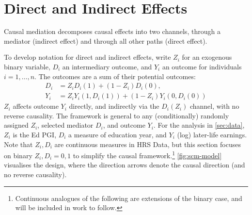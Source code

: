 \section{Direct and Indirect Effects}
\label{sec:concepts}
Causal mediation decomposes causal effects into two channels, through a mediator (indirect effect) and through all other paths (direct effect).


To develop notation for direct and indirect effects, write $Z_i$ for an exogenous binary variable, $D_i$ an intermediary outcome, and $Y_i$ an outcome for individuals $i = 1, \hdots, n$.
The outcomes are a sum of their potential outcomes:
\begin{align*}
    D_i &= Z_i       D_i(1)
        + (1 - Z_i) D_i(0),  \\
    Y_i &= Z_i       Y_i(1, D_i(1))
        + (1 - Z_i) Y_i(0, D_i(0))
\end{align*}
$Z_i$ affects outcome $Y_i$ directly, and indirectly via the $D_i(Z_i)$ channel, with no reverse causality.
The framework is general to any (conditionally) randomly assigned $Z_i$, selected mediator $D_i$, and outcome $Y_i$.
For the analysis in \autoref{sec:data}, $Z_i$ is the Ed PGI, $D_i$ a measure of education year, and $Y_i$ (log) later-life earnings.
Note that     $Z_i, D_i$ are continuous measures in HRS Data, but this section focuses on binary $Z_i, D_i = 0,1$ to simplify the causal framework.\footnote{
    Continuous analogues of the following are extensions of the binary case, and will be included in work to follow.
}
\autoref{fig:scm-model} visualises the design, where the direction arrows denote the causal direction (and no reverse causality).

